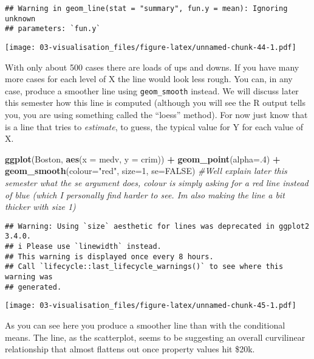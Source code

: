 \documentclass[
]{book}
\newenvironment{Shaded}{\begin{snugshade}}{\end{snugshade}}
\newcommand{\AttributeTok}[1]{\textcolor[rgb]{0.13,0.29,0.53}{#1}}
\newcommand{\CommentTok}[1]{\textcolor[rgb]{0.56,0.35,0.01}{\textit{#1}}}
\newcommand{\ConstantTok}[1]{\textcolor[rgb]{0.56,0.35,0.01}{#1}}
\newcommand{\DecValTok}[1]{\textcolor[rgb]{0.00,0.00,0.81}{#1}}
\newcommand{\FunctionTok}[1]{\textcolor[rgb]{0.13,0.29,0.53}{\textbf{#1}}}
\newcommand{\NormalTok}[1]{#1}
\newcommand{\SpecialCharTok}[1]{\textcolor[rgb]{0.81,0.36,0.00}{\textbf{#1}}}
\newcommand{\StringTok}[1]{\textcolor[rgb]{0.31,0.60,0.02}{#1}}
\begin{document}
\begin{verbatim}
## Warning in geom_line(stat = "summary", fun.y = mean): Ignoring unknown
## parameters: `fun.y`
\end{verbatim}

\texttt{[image: 03-visualisation\_files/figure-latex/unnamed-chunk-44-1.pdf]}

With only about 500 cases there are loads of ups and downs. If you have many more cases for each level of X the line would look less rough. You can, in any case, produce a smoother line using \texttt{geom\_smooth} instead. We will discuss later this semester how this line is computed (although you will see the R output tells you, you are using something called the ``loess'' method). For now just know that is a line that tries to \emph{estimate}, to guess, the typical value for Y for each value of X.

\begin{Shaded}
\begin{Highlighting}[]
\FunctionTok{ggplot}\NormalTok{(Boston, }\FunctionTok{aes}\NormalTok{(}\AttributeTok{x =}\NormalTok{ medv, }\AttributeTok{y =}\NormalTok{ crim)) }\SpecialCharTok{+}
  \FunctionTok{geom\_point}\NormalTok{(}\AttributeTok{alpha=}\NormalTok{.}\DecValTok{4}\NormalTok{) }\SpecialCharTok{+}
  \FunctionTok{geom\_smooth}\NormalTok{(}\AttributeTok{colour=}\StringTok{"red"}\NormalTok{, }\AttributeTok{size=}\DecValTok{1}\NormalTok{, }\AttributeTok{se=}\ConstantTok{FALSE}\NormalTok{) }\CommentTok{\#We\textquotesingle{}ll explain later this semester what the se argument does, colour is simply asking for a red line instead of blue (which I personally find harder to see. I\textquotesingle{}m also making the line a bit thicker with size 1)}
\end{Highlighting}
\end{Shaded}

\begin{verbatim}
## Warning: Using `size` aesthetic for lines was deprecated in ggplot2 3.4.0.
## i Please use `linewidth` instead.
## This warning is displayed once every 8 hours.
## Call `lifecycle::last_lifecycle_warnings()` to see where this warning was
## generated.
\end{verbatim}

\texttt{[image: 03-visualisation\_files/figure-latex/unnamed-chunk-45-1.pdf]}

As you can see here you produce a smoother line than with the conditional means. The line, as the scatterplot, seems to be suggesting an overall curvilinear relationship that almost flattens out once property values hit \$20k.
\end{document}
